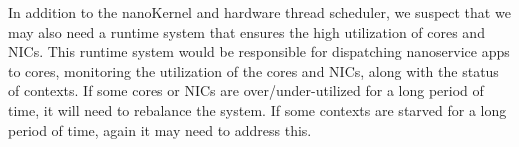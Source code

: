 In addition to the nanoKernel and hardware thread scheduler, we suspect that we may also need a runtime system that ensures the high utilization of \name{} cores and NICs.
This runtime system would be responsible for dispatching nanoservice apps to \name{} cores, monitoring the utilization of the cores and NICs, along with the status of contexts.
If some cores or NICs are over/under-utilized for a long period of time, it will need to rebalance the system.
If some contexts are starved for a long period of time, again it may need to address this.

